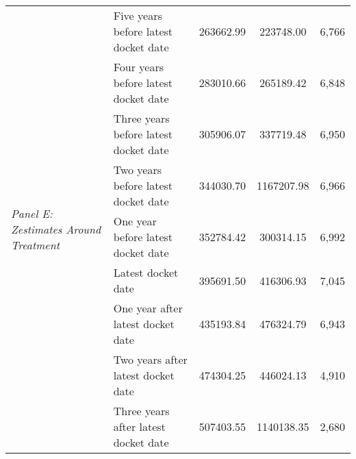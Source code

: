 \begin{table}[H]
\begin{tabular}{llccc}
\cline{1-5}
\multirow[c]{9}{4cm}{\textit{Panel E: Zestimates Around Treatment}} & Five years before latest docket date & 263662.99 & 223748.00 & 6,766 \\
 & Four years before latest docket date & 283010.66 & 265189.42 & 6,848 \\
 & Three years before latest docket date & 305906.07 & 337719.48 & 6,950 \\
 & Two years before latest docket date & 344030.70 & 1167207.98 & 6,966 \\
 & One year before latest docket date & 352784.42 & 300314.15 & 6,992 \\
 & Latest docket date & 395691.50 & 416306.93 & 7,045 \\
 & One year after latest docket date & 435193.84 & 476324.79 & 6,943 \\
 & Two years after latest docket date & 474304.25 & 446024.13 & 4,910 \\
 & Three years after latest docket date & 507403.55 & 1140138.35 & 2,680 \\
\cline{1-5}
\bottomrule
\end{tabular}
\end{table}
